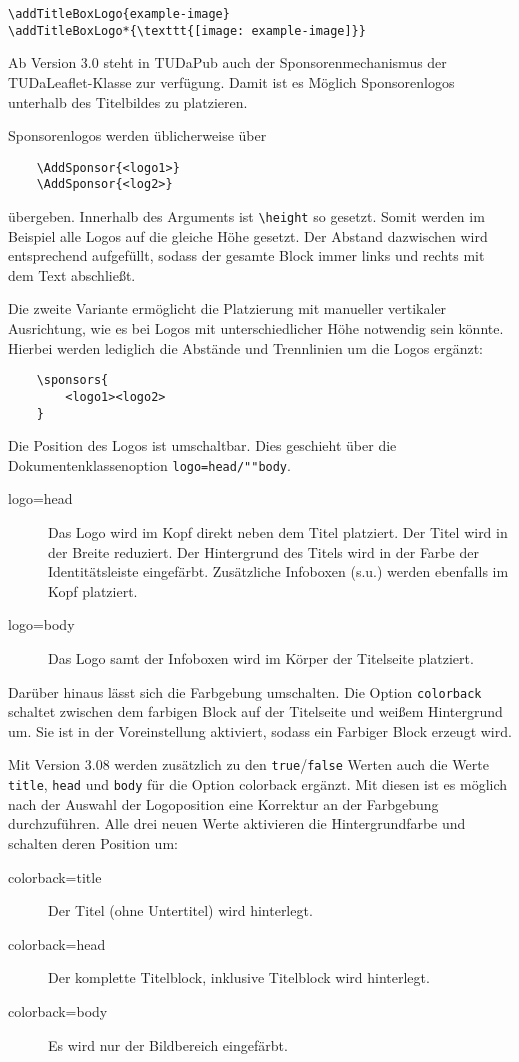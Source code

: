 \documentclass[
	ngerman,
	accentcolor=9c,%
	]{tudapub}
\let\code\texttt
\begin{document}
\begin{verbatim}
\addTitleBoxLogo{example-image}
\addTitleBoxLogo*{\texttt{[image: example-image]}}
\end{verbatim}

Ab Version 3.0 steht in TUDaPub auch der Sponsorenmechanismus der TUDaLeaflet-Klasse zur verfügung. Damit ist es Möglich Sponsorenlogos unterhalb des Titelbildes zu platzieren.

Sponsorenlogos werden üblicherweise über
\begin{verbatim}
	\AddSponsor{<logo1>}
	\AddSponsor{<log2>}
\end{verbatim}
übergeben. Innerhalb des Arguments ist \verb+\height+ so gesetzt. Somit werden im Beispiel alle Logos auf die gleiche Höhe gesetzt. Der Abstand dazwischen wird entsprechend aufgefüllt, sodass der gesamte Block immer links und rechts mit dem Text abschließt.

Die zweite Variante ermöglicht die Platzierung mit manueller vertikaler Ausrichtung, wie es bei Logos mit unterschiedlicher Höhe notwendig sein könnte. Hierbei werden lediglich die Abstände und Trennlinien um die Logos ergänzt:

\begin{verbatim}
	\sponsors{
		<logo1><logo2>
	}
\end{verbatim}


Die Position des Logos ist umschaltbar. Dies geschieht über die Dokumentenklassenoption \code{logo=head/""body}.
\begin{description}
	\item[logo=head] Das Logo wird im Kopf direkt neben dem Titel platziert. Der Titel wird in der Breite reduziert. Der Hintergrund des Titels wird in der Farbe der Identitätsleiste eingefärbt. Zusätzliche Infoboxen (s.u.) werden ebenfalls im Kopf platziert.
	\item[logo=body] Das Logo samt der Infoboxen wird im Körper der Titelseite platziert.
\end{description}

Darüber hinaus lässt sich die Farbgebung umschalten.
Die Option \code{colorback} schaltet zwischen dem farbigen Block auf der Titelseite und weißem Hintergrund um. Sie ist in der Voreinstellung aktiviert, sodass ein Farbiger Block erzeugt wird.

Mit Version 3.08 werden zusätzlich zu den \code{true}/\code{false} Werten auch die Werte \code{title}, \code{head} und \code{body} für die Option colorback ergänzt.
Mit diesen ist es möglich nach der Auswahl der Logoposition eine Korrektur an der Farbgebung durchzuführen. Alle drei neuen Werte aktivieren die Hintergrundfarbe und schalten deren Position um:
\begin{description}
	\item[colorback=title] Der Titel (ohne Untertitel) wird hinterlegt.
	\item[colorback=head] Der komplette Titelblock, inklusive Titelblock wird hinterlegt.
	\item[colorback=body] Es wird nur der Bildbereich eingefärbt.
\end{description}
\end{document}
